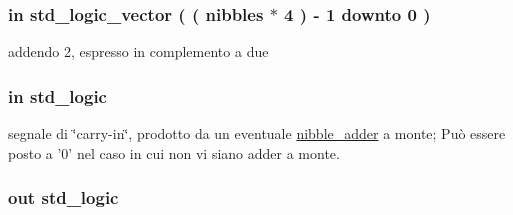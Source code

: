 \hypertarget{group___carry_loockahead_ga2715463c615cf8418f85c6a1427ce62c}{
\subsubsection[{addendum2}]{ {\bfseries \textcolor{vhdlchar}{in}\textcolor{vhdlchar}{ }} {\bfseries \textcolor{vhdlchar}{std\+\_\+logic\+\_\+vector}\textcolor{vhdlchar}{ }\textcolor{vhdlchar}{(}\textcolor{vhdlchar}{ }\textcolor{vhdlchar}{(}\textcolor{vhdlchar}{ }\textcolor{vhdlchar}{ }\textcolor{vhdlchar}{ }\textcolor{vhdlchar}{ }{\bfseries {\bf nibbles}} \textcolor{vhdlchar}{$\ast$}\textcolor{vhdlchar}{ } \textcolor{vhdldigit}{4} \textcolor{vhdlchar}{ }\textcolor{vhdlchar}{)}\textcolor{vhdlchar}{ }\textcolor{vhdlchar}{-\/}\textcolor{vhdlchar}{ } \textcolor{vhdldigit}{1} \textcolor{vhdlchar}{ }\textcolor{vhdlchar}{downto}\textcolor{vhdlchar}{ }\textcolor{vhdlchar}{ } \textcolor{vhdldigit}{0} \textcolor{vhdlchar}{ }\textcolor{vhdlchar}{)}\textcolor{vhdlchar}{ }} \hspace{0.3cm}{\ttfamily [Port]}}}\label{group___carry_loockahead_ga2715463c615cf8418f85c6a1427ce62c}


addendo 2, espresso in complemento a due 

\hypertarget{group___carry_loockahead_ga1c211cdf2d4cf97e869c442832c53439}{
\subsubsection[{carry\+\_\+in}]{ {\bfseries \textcolor{vhdlchar}{in}\textcolor{vhdlchar}{ }} {\bfseries \textcolor{vhdlchar}{std\+\_\+logic}\textcolor{vhdlchar}{ }} \hspace{0.3cm}{\ttfamily [Port]}}}\label{group___carry_loockahead_ga1c211cdf2d4cf97e869c442832c53439}


segnale di \char`\"{}carry-\/in\char`\"{}, prodotto da un eventuale \hyperlink{classnibble__adder}{nibble\+\_\+adder} a monte; Può essere posto a '0' nel caso in cui non vi siano adder a monte. 

\hypertarget{group___carry_loockahead_ga851aaea297bdc862fba5478c4bf0e214}{
\subsubsection[{carry\+\_\+out}]{ {\bfseries \textcolor{vhdlchar}{out}\textcolor{vhdlchar}{ }} {\bfseries \textcolor{vhdlchar}{std\+\_\+logic}\textcolor{vhdlchar}{ }} \hspace{0.3cm}{\ttfamily [Port]}}}\label{group___carry_loockahead_ga851aaea297bdc862fba5478c4bf0e214}


